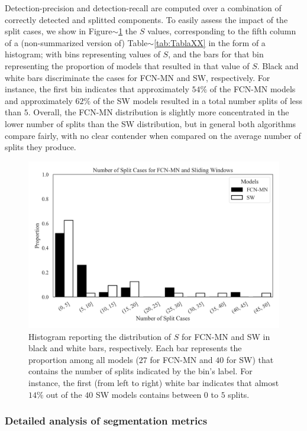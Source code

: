 \documentclass[a4paper,authoryear,review]{elsarticle}
\begin{document}
 
Detection-precision and detection-recall are computed over a combination of correctly detected and splitted components. To easily assess the impact of the split cases, we show in Figure$\sim$\ref{fig:number-of-split} the $S$ values, corresponding to the fifth column of a   (non-summarized version of) Table$\sim$\ref{tab:TablaXX} in the form of a histogram; with bins representing values of $S$,  and the bars for that bin representing the proportion of models that resulted in that value of $S$. Black and white bars discriminate the cases for FCN-MN and SW, respectively. For instance, the first bin indicates that approximately $54\%$ of the FCN-MN models and approximately $62\%$ of the SW models resulted in a total number splits of less than $5$. Overall, the FCN-MN distribution is slightly more concentrated in the lower number of splits than the SW distribution, but in general both algorithms compare fairly, with no clear contender when compared on the average number of splits they produce. 


\begin{figure}
    \centering
    \includegraphics[width=\textwidth]{figures/PPP_split_distribution.png}
    \caption{Histogram reporting the distribution of $S$ for FCN-MN and SW in black and white bars, respectively. Each bar represents the proportion among all models ($27$ for FCN-MN  and $40$ for SW) that contains the number of splits indicated by the bin’s label. For instance, the first (from left to right) white bar indicates that almost $14\%$ out of the $40$ SW models contains between $0$ to $5$ splits. }
    \label{fig:number-of-split}
\end{figure}


\subsubsection{Detailed analysis of segmentation metrics}
\end{document}

